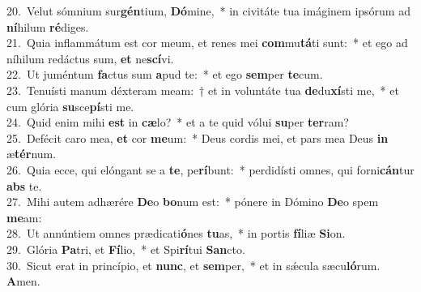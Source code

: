 {20.~}Velut sómnium sur\textbf{gén}tium, \textbf{Dó}mine,~* in civitáte tua imáginem ipsórum ad \textbf{ní}hilum \textbf{ré}diges.\\
{21.~}Quia inflammátum est cor meum, et renes mei \textbf{com}mu\textbf{tá}ti sunt:~* et ego ad níhilum redáctus sum, \textbf{et} ne\textbf{scí}vi.\\
{22.~}Ut juméntum \textbf{fa}ctus sum \textbf{a}pud te:~* et ego \textbf{sem}per \textbf{te}cum.\\
{23.~}Tenuísti manum déxteram meam:~† et in voluntáte tua \textbf{de}du\textbf{xí}sti me,~* et cum glória \textbf{su}sce\textbf{pí}sti me.\\
{24.~}Quid enim mihi \textbf{est} in \textbf{cæ}lo?~* et a te quid vólui \textbf{su}per \textbf{ter}ram?\\
{25.~}Defécit caro mea, \textbf{et} cor \textbf{me}um:~* Deus cordis mei, et pars mea Deus \textbf{in} æ\textbf{tér}num.\\
{26.~}Quia ecce, qui elóngant se a \textbf{te}, pe\textbf{rí}bunt:~* perdidísti omnes, qui forni\textbf{cán}tur \textbf{abs} te.\\
{27.~}Mihi autem adhærére \textbf{De}o \textbf{bo}num est:~* pónere in Dómino \textbf{De}o spem \textbf{me}am:\\
{28.~}Ut annúntiem omnes prædicati\textbf{ó}nes \textbf{tu}as,~* in portis \textbf{fí}liæ \textbf{Si}on.\\
{29.~}Glória \textbf{Pa}tri, et \textbf{Fí}lio,~* et Spi\textbf{rí}tui \textbf{San}cto.\\
{30.~}Sicut erat in princípio, et \textbf{nunc}, et \textbf{sem}per,~* et in sǽcula sæcu\textbf{ló}rum. \textbf{A}men.\\
